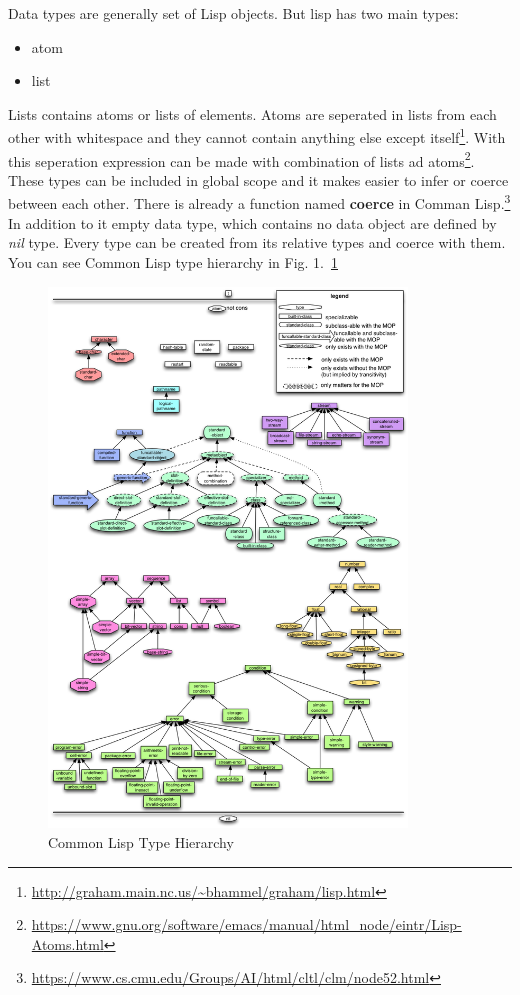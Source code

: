 \documentclass[11pt]{article}
\begin{document}
\par
Data types are generally set of Lisp objects. But lisp has two main types:
\begin{itemize}
\item atom
\item list
\end{itemize}
Lists contains atoms or lists of elements. Atoms are seperated in lists from each other with whitespace and they cannot contain anything else except itself\footnote{\url{http://graham.main.nc.us/~bhammel/graham/lisp.html}}. With this seperation expression can be made with combination of lists ad atoms\footnote{\url{https://www.gnu.org/software/emacs/manual/html_node/eintr/Lisp-Atoms.html}}. These types can be included in global scope and it makes easier to infer or coerce between each other. There is already a function named \textbf{coerce} in Comman Lisp.\footnote{\url{https://www.cs.cmu.edu/Groups/AI/html/cltl/clm/node52.html}}
In addition to it empty data type, which contains no data object are defined by \textit{nil} type.
Every type can be created from its relative types and coerce with them. You can see Common Lisp type hierarchy in Fig. 1.~\ref{fig:clisphier}


\begin{figure}
\label{fig:clisphier}
\caption{Common Lisp Type Hierarchy}
\centering
\includegraphics[width=0.85\textwidth]{CL-type-hierarchy}
\end{figure}

\listoffigures
\end{document}
